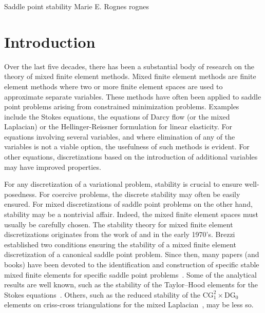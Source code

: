               {Saddle point stability}
              {Marie E. Rognes}
              {rognes}

\newcommand{\rognesc}{c}
\newcommand{\rognestriang}{\mathcal{T}}
\newcommand{\rognescodeintext}[1]{\texttt{\small #1}}

\newcommand{\rognescg}{\mathrm{CG}}
\newcommand{\rognesrt}{\mathrm{RT}}
\newcommand{\rognesdg}{\mathrm{DG}}
\newcommand{\rognesascot}{ASCoT}
\newcommand{\rognespython}{python}

\section{Introduction}

Over the last five decades, there has been a substantial body of
research on the theory of mixed finite element methods.  Mixed finite
element methods are finite element methods where two or more finite
element spaces are used to approximate separate variables.  These
methods have often been applied to saddle point problems arising from
constrained minimization problems. Examples include the Stokes
equations, the equations of Darcy flow (or the mixed Laplacian) or the
Hellinger-Reissner formulation for linear elasticity.  For equations
involving several variables, and where elimination of any of the
variables is not a viable option, the usefulness of such methods is
evident. For other equations, discretizations based on the
introduction of additional variables may have improved properties.

For any discretization of a variational problem, stability is crucial
to ensure well-posedness. For coercive problems, the discrete
stability may often be easily ensured. For mixed discretizations of
saddle point problems on the other hand, stability may be a nontrivial
affair. Indeed, the mixed finite element spaces must usually be
carefully chosen. The stability theory for mixed finite element
discretizations originates from the work of \citet{Babuvska1972/73}
and \citet{Brezzi1974} in the early
1970's. Brezzi established two conditions ensuring the stability of a
mixed finite element discretization of a canonical saddle point
problem.  Since then, many papers (and books) have been devoted to the
identification and construction of specific stable mixed finite
elements for specific saddle point
problems~\citep{ArnoldFalkWinther2006, BrezziDouglasMarini1985,
  BrezziFalk1991, BrezziFortin1991, RaviartThomas1977,
  TaylorHood1973}. Some of the analytical results are well known, such
as the stability of the Taylor--Hood elements for the Stokes
equations~\citep{BrezziFalk1991, Stenberg1984, TaylorHood1973}.
Others, such as the reduced stability of the $\rognescg_1^2 \times
\rognesdg_0$ elements on criss-cross triangulations for the mixed
Laplacian~\citep{BoffiBrezziGastaldi2000}, may be less so.

